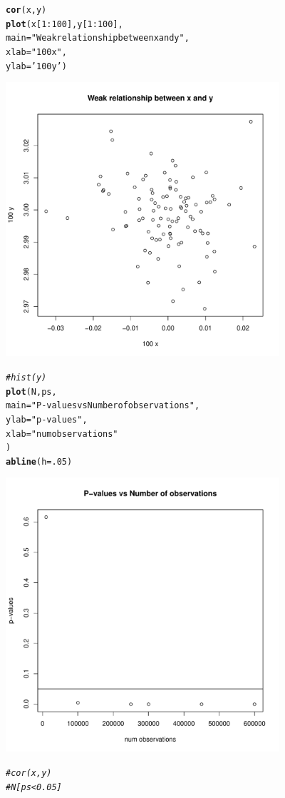 \documentclass{article}\usepackage[]{graphicx}\usepackage[]{color}
\makeatletter
\newcommand{\hlnum}[1]{\textcolor[rgb]{0.686,0.059,0.569}{#1}}%
\newcommand{\hlstr}[1]{\textcolor[rgb]{0.192,0.494,0.8}{#1}}%
\newcommand{\hlcom}[1]{\textcolor[rgb]{0.678,0.584,0.686}{\textit{#1}}}%
\newcommand{\hlopt}[1]{\textcolor[rgb]{0,0,0}{#1}}%
\newcommand{\hlstd}[1]{\textcolor[rgb]{0.345,0.345,0.345}{#1}}%
\newcommand{\hlkwc}[1]{\textcolor[rgb]{0.333,0.667,0.333}{#1}}%
\newcommand{\hlkwd}[1]{\textcolor[rgb]{0.737,0.353,0.396}{\textbf{#1}}}%
\newenvironment{kframe}{%
 \def\at@end@of@kframe{}%
 \ifinner\ifhmode%
  \def\at@end@of@kframe{\end{minipage}}%
  \begin{minipage}{\columnwidth}%
 \fi\fi%
 \def\FrameCommand##1{\hskip\@totalleftmargin \hskip-\fboxsep
 \colorbox{shadecolor}{##1}\hskip-\fboxsep
     \hskip-\linewidth \hskip-\@totalleftmargin \hskip\columnwidth}%
 \MakeFramed {\advance\hsize-\width
   \@totalleftmargin\z@ \linewidth\hsize
   \@setminipage}}%
 {\par\unskip\endMakeFramed%
 \at@end@of@kframe}
\newenvironment{knitrout}{}{} %
\makeatother
\begin{document}
\begin{knitrout}
\begin{kframe}
\begin{alltt}
\hlkwd{cor}\hlstd{(x,y)}
\hlkwd{plot}\hlstd{(x[}\hlnum{1}\hlopt{:}\hlnum{100}\hlstd{], y[}\hlnum{1}\hlopt{:}\hlnum{100}\hlstd{],}
     \hlkwc{main} \hlstd{=} \hlstr{"Weak relationship between x and y"}\hlstd{,}
     \hlkwc{xlab} \hlstd{=} \hlstr{"100 x"}\hlstd{,}
     \hlkwc{ylab} \hlstd{=} \hlstr{'100 y'}\hlstd{)}
\end{alltt}
\end{kframe}
\includegraphics[width=4in]{figure/p1-1} 
\begin{kframe}\begin{alltt}
\hlcom{#hist(y)}
\hlkwd{plot}\hlstd{(N, ps,}
     \hlkwc{main} \hlstd{=} \hlstr{"P-values vs Number of observations"}\hlstd{,}
     \hlkwc{ylab} \hlstd{=} \hlstr{"p-values"}\hlstd{,}
     \hlkwc{xlab} \hlstd{=} \hlstr{"num observations"}
\hlstd{)}
\hlkwd{abline}\hlstd{(}\hlkwc{h} \hlstd{=} \hlnum{.05}\hlstd{)}
\end{alltt}
\end{kframe}
\includegraphics[width=4in]{figure/p1-2} 
\begin{kframe}\begin{alltt}
\hlcom{#cor(x, y)}
\hlcom{#N[ps < 0.05]}
\end{alltt}
\end{kframe}
\end{knitrout}
\end{document}
